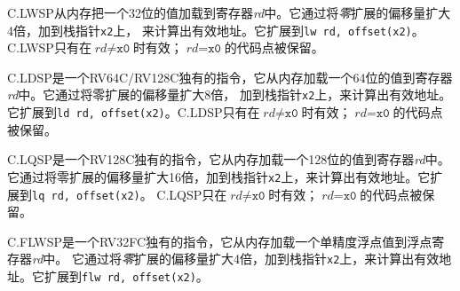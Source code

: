 C.LWSP从内存把一个32位的值加载到寄存器{\em rd}中。它通过将{\em 零}扩展的偏移量扩大4倍，加到栈指针{\tt x2}上，
来计算出有效地址。它扩展到{\tt lw rd, offset(x2)}。C.LWSP只有在$\textit{rd}{\neq}\texttt{x0}$时有效；$\textit{rd}{=}\texttt{x0}$的代码点被保留。

C.LDSP是一个RV64C/RV128C独有的指令，它从内存加载一个64位的值到寄存器{\em rd}中。它通过将零扩展的偏移量扩大8倍，
加到栈指针{\tt x2}上，来计算出有效地址。它扩展到{\tt ld rd, offset(x2)}。C.LDSP只有在$\textit{rd}{\neq}\texttt{x0}$时有效；$\textit{rd}{=}\texttt{x0}$的代码点被保留。

C.LQSP是一个RV128C独有的指令，它从内存加载一个128位的值到寄存器{\em rd}中。
它通过将零扩展的偏移量扩大16倍，加到栈指针{\tt x2}上，来计算出有效地址。它扩展到{\tt lq rd, offset(x2)}。
C.LQSP只在$\textit{rd}{\neq}\texttt{x0}$时有效；$\textit{rd}{=}\texttt{x0}$的代码点被保留。

C.FLWSP是一个RV32FC独有的指令，它从内存加载一个单精度浮点值到浮点寄存器{\em rd}中。
它通过将{\em 零}扩展的偏移量扩大4倍，加到栈指针{\tt x2}上，来计算出有效地址。它扩展到{\tt flw rd, offset(x2)}。

